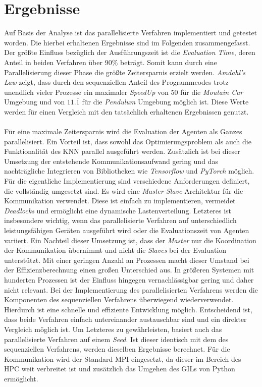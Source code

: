 \section{Ergebnisse}
\label{sec:results_optimziation}
Auf Basis der Analyse ist das parallelisierte Verfahren implementiert und getestet worden. Die hierbei erhaltenen Ergebnisse sind im Folgenden zusammengefasst. Der größte Einfluss bezüglich der Ausführungszeit ist die \emph{Evaluation Time}, deren Anteil in beiden Verfahren über $90\%$ beträgt. Somit kann durch eine Parallelisierung dieser Phase die größte Zeitersparnis erzielt werden. \emph{Amdahl's Law} zeigt, dass durch den sequenziellen Anteil des Programmcodes trotz unendlich vieler Prozesse ein maximaler \emph{SpeedUp} von $50$ für die \emph{Moutain Car} Umgebung und von $11.\overline{1}$ für die \emph{Pendulum} Umgebung möglich ist. Diese Werte werden für einen Vergleich mit den tatsächlich erhaltenen Ergebnissen genutzt.
\\\\ %
Für eine maximale Zeitersparnis wird die Evaluation der Agenten als Ganzes parallelisiert. Ein Vorteil ist, dass sowohl das Optimierungsproblem als auch die Funktionalität des \ac{KNN} parallel ausgeführt werden. Zusätzlich ist bei dieser Umsetzung der entstehende Kommunikationsaufwand gering und das nachträgliche Integrieren von Bibliotheken wie \emph{Tensorflow} und \emph{PyTorch} möglich. Für die eigentliche Implementierung sind verschiedene Anforderungen definiert, die vollständig umgesetzt sind. Es wird eine \emph{Master-Slave} Architektur für die Kommunikation verwendet. Diese ist einfach zu implementieren, vermeidet \emph{Deadlocks} und ermöglicht eine dynamische Lastenverteilung. Letzteres ist insbesondere wichtig, wenn das parallelisierte Verfahren auf unterschiedlich leistungsfähigen Geräten ausgeführt wird oder die Evaluationszeit von Agenten variiert. Ein Nachteil dieser Umsetzung ist, dass der \emph{Master} nur die Koordination der Kommunikation übernimmt und nicht die \emph{Slaves} bei der Evaluation unterstützt. Mit einer geringen Anzahl an Prozessen macht dieser Umstand bei der Effizienzberechnung einen großen Unterschied aus. In größeren Systemen mit hunderten Prozessen ist der Einfluss hingegen vernachlässigbar gering und daher nicht relevant. Bei der Implementierung des parallelisierten Verfahrens werden die Komponenten des sequenziellen Verfahrens überwiegend wiederverwendet. Hierdurch ist eine schnelle und effiziente Entwicklung möglich. Entscheidend ist, dass beide Verfahren einfach untereinander austauschbar sind und ein direkter Vergleich möglich ist. Um Letzteres zu gewährleisten, basiert auch das parallelisierte Verfahren auf einem \emph{Seed}. Ist dieser identisch mit dem des sequenziellen Verfahrens, werden dieselben Ergebnisse berechnet. Für die Kommunikation wird der Standard \ac{MPI} eingesetzt, da dieser im Bereich des \ac{HPC} weit verbreitet ist und zusätzlich das Umgehen des \acp{GIL} von Python ermöglicht.
